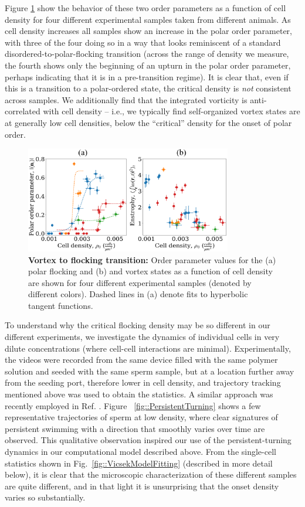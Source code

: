 \documentclass[reprint,unsortedaddress,amsmath,amssymb,aps,pre]{revtex4-2}
\begin{document}
Figure \ref{fig::DensityTunedPhaseTransition} show the behavior of these two order parameters as a function of cell density for four different experimental samples taken from different animals. As cell density increases all samples show an increase in the polar order parameter, with three of the four doing so in a way that looks reminiscent of a standard disordered-to-polar-flocking transition (across the range of density we measure, the fourth shows only the beginning of an upturn in the polar order parameter, perhaps indicating that it is in a pre-transition regime). It is clear that, even if this is a transition to a polar-ordered state, the critical density is \emph{not} consistent across samples. We additionally find that the integrated vorticity is anti-correlated with cell density -- i.e., we typically find self-organized vortex states are at generally low cell densities, below the ``critical'' density for the onset of polar order. 
  
\begin{figure}[ht]
    \centering
    \includegraphics[width=90mm]{fig_VortexToFlockingTransition.PNG}
    \caption{\label{fig::DensityTunedPhaseTransition}
    \textbf{Vortex to flocking transition:} Order parameter values for the (a) polar flocking and (b) and vortex states as a function of cell density are shown for four different experimental samples (denoted by different colors).  Dashed lines in (a) denote fits to hyperbolic tangent functions.}
\end{figure}

To understand why the critical flocking density may be so different in our different experiments, we investigate the dynamics of individual cells in very dilute concentrations (where cell-cell interactions are minimal). Experimentally, the videos were recorded from the same device filled with the same polymer solution and seeded with the same sperm sample, but at a location further away from the seeding port, therefore lower in cell density, and trajectory tracking mentioned above was used to obtain the statistics. A similar approach was recently employed in Ref. \cite{zaferani2023biphasic}. Figure ~\ref{fig::PersistentTurning} shows a few representative trajectories of sperm at low density, where clear signatures of persistent swimming with a direction that smoothly varies over time are observed. This qualitative observation inspired our use of the persistent-turning dynamics in our computational model described above. From the single-cell statistics shown in Fig.~\ref{fig::VicsekModelFitting} (described in more detail below), it is clear that the microscopic characterization of these different samples are quite different, and in that light it is unsurprising that the onset density varies so substantially. 
\end{document}
